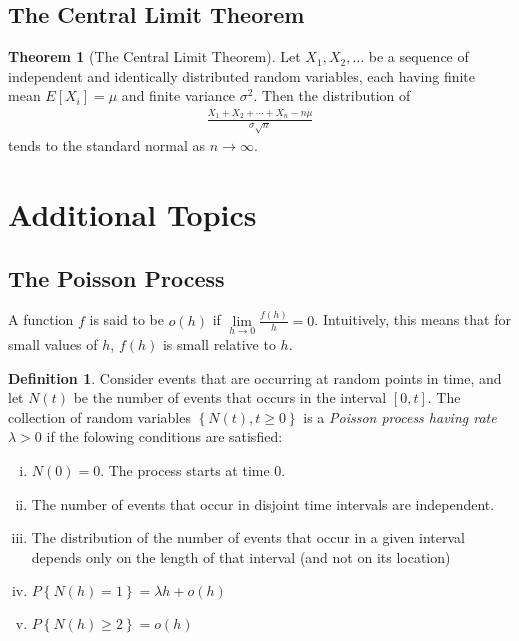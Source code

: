 \documentclass[10pt]{article}
\theoremstyle{definition}
\newtheorem*{definition}{Definition}
\theoremstyle{theorem}
\newtheorem*{theorem}{Theorem}
\begin{document}
		\subsection*{The Central Limit Theorem}
		
		\begin{theorem}[The Central Limit Theorem]
			Let \(X_1, X_2,\ldots\) be a sequence of independent and identically distributed random variables, each having finite mean \(E[X_i]=\mu\) and finite variance \(\sigma^2\). Then the distribution of
			\begin{align*}
				\frac{X_1 + X_2 + \cdots + X_n - n\mu}{\sigma \sqrt{n}}
			\end{align*}
			tends to the standard normal as \(n \to \infty\).
		\end{theorem}
		
		\section{Additional Topics}
		\subsection*{The Poisson Process}
		A function \(f\) is said to be \(o(h)\) if \(\lim\limits_{h \to 0}\frac{f(h)}{h}=0\). Intuitively, this means that for small values of \(h\), \(f(h)\) is small relative to \(h\).
		
		\begin{definition}
			Consider events that are occurring at random points in time, and let \(N(t)\) be the number of events that occurs in the interval \([0,t]\). The collection of random variables \(\left\{N(t), t \geq 0\right\}\) is a \emph{Poisson process having rate \(\lambda>0\)} if the folowing conditions are satisfied:
			\begin{enumerate}[(i)]
				\item \(N(0)=0\). The process starts at time \(0\).
				\item The number of events that occur in disjoint time intervals are independent.
				\item The distribution of the number of events that occur in a given interval depends only on the length of that interval (and not on its location)
				\item \(P\left\{N(h)=1\right\} = \lambda h + o(h)\)
				\item \(P\left\{N(h)\geq 2\right\} = o(h)\)
			\end{enumerate}
		\end{definition}
\end{document}
